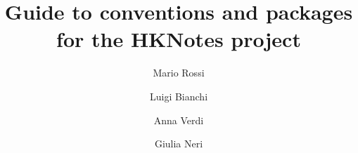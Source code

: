 \documentclass[english,12pt,toc=sections]{HKNdocument}
\title{Guide to conventions and packages for the HKNotes project}
\author{Mario Rossi}
\author{Luigi Bianchi}
\author{Anna Verdi}
\author{Giulia Neri}
\begin{document}
\frontmatter
\maketitle
\cclicense
\tableofcontents
\clearpage

\mainmatter



%




\backmatter

\end{document}
